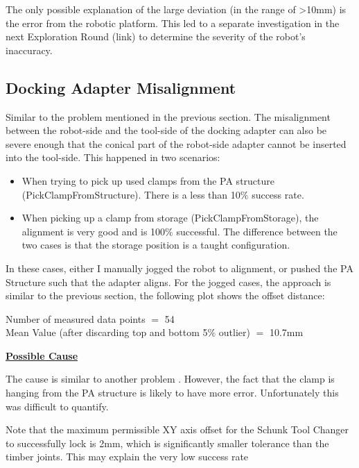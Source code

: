 The only possible explanation of the large deviation (in the range of >10mm) is the error from the robotic platform. This led to a separate investigation in the next Exploration Round (link) to determine the severity of the robot’s inaccuracy.

\subsection{Docking Adapter Misalignment}
\label{subsection:exploration-3-docking-adapter-misalignment}

Similar to the problem mentioned in the previous section. The misalignment between the robot-side and the tool-side of the docking adapter can also be severe enough that the conical part of the robot-side adapter cannot be inserted into the tool-side. This happened in two scenarios:

\begin{itemize}
	\item When trying to pick up used clamps from the PA structure (PickClampFromStructure). There is a less than 10$\%$ success rate.

	\item When picking up a clamp from storage (PickClampFromStorage), the alignment is very good and is 100$\%$ successful. The difference between the two cases is that the storage position is a taught configuration.

\end{itemize}
In these cases, either I manually jogged the robot to alignment, or pushed the PA Structure such that the adapter aligns. For the jogged cases, the approach is similar to the previous section, the following plot shows the offset distance:


{\footnotesize Number of measured data points $=$ 54 \\ Mean Value (after discarding top and bottom 5$\%$ outlier) $=$ 10.7mm}

\textbf{\ul{Possible Cause}}

The cause is similar to another problem . However, the fact that the clamp is hanging from the PA structure is likely to have more error. Unfortunately this was difficult to quantify. 

Note that the maximum permissible XY axis offset for the Schunk Tool Changer to successfully lock is 2mm, which is significantly smaller tolerance than the timber joints. This may explain the very low success rate

